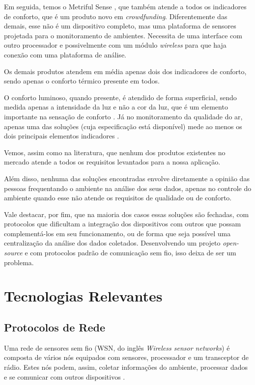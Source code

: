 \documentclass[../monografia.tex]{subfiles}
\begin{document}
Em seguida, temos o Metriful Sense \cite{metriful}, que também atende a todos os indicadores de conforto, que é um produto novo em \textit{crowdfunding}. Diferentemente das demais, esse não é um dispositivo completo, mas uma plataforma de sensores projetada para o monitoramento de ambientes. Necessita de uma interface com outro processador e possivelmente com um módulo \textit{wireless} para que haja conexão com uma plataforma de análise. 

Os demais produtos atendem em média apenas dois dos indicadores de conforto, sendo apenas o conforto térmico presente em todos. 

O conforto luminoso, quando presente, é atendido de forma superficial, sendo medida apenas a intensidade da luz e não a cor da luz, que é um elemento importante na sensação de conforto \cite{VisualComfort}. Já no monitoramento da qualidade do ar, apenas uma das soluções \cite{ECOMLITE} (cuja especificação está disponível) mede ao menos os dois principais elementos indicadores \cite{AirQuality}. 

Vemos, assim como na literatura, que nenhum dos produtos existentes no mercado atende a todos os requisitos levantados para a nossa aplicação. 

Além disso, nenhuma das soluções encontradas envolve diretamente a opinião das pessoas frequentando o ambiente na análise dos seus dados, apenas no controle do ambiente quando esse não atende os requisitos de qualidade ou de conforto. 

Vale destacar, por fim, que na maioria dos casos essas soluções são fechadas, com protocolos que dificultam a integração dos dispositivos com outros que possam complementá-los em seu funcionamento, ou de forma que seja possível uma centralização da análise dos dados coletados. Desenvolvendo um projeto \textit{open-source} e com protocolos padrão de comunicação sem fio, isso deixa de ser um problema. 

\section{Tecnologias Relevantes} 

\subsection{Protocolos de Rede} 

Uma rede de sensores sem fio (WSN, do inglês \textit{Wireless sensor networks}) é composta de vários nós equipados com sensores, processador e um transceptor de rádio. Estes nós podem, assim, coletar informações do ambiente, processar dados e se comunicar com outros dispositivos \cite{wsn-networking}.
\end{document}
